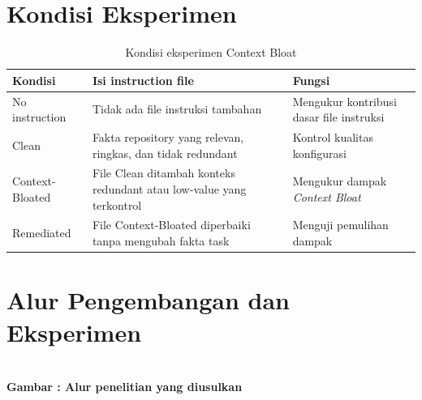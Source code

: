 \section{Kondisi Eksperimen}

\begin{table}[htbp]
\centering
\small
\caption{Kondisi eksperimen Context Bloat}
\label{tab:conditions}
\begin{tabularx}{\textwidth}{p{3.0cm}YY}
\toprule
\textbf{Kondisi} & \textbf{Isi instruction file} & \textbf{Fungsi} \\
\midrule
No instruction & Tidak ada file instruksi tambahan & Mengukur kontribusi dasar file instruksi \\
Clean & Fakta repository yang relevan, ringkas, dan tidak redundant & Kontrol kualitas konfigurasi \\
Context-Bloated & File Clean ditambah konteks redundant atau low-value yang terkontrol & Mengukur dampak \textit{Context Bloat} \\
Remediated & File Context-Bloated diperbaiki tanpa mengubah fakta task & Menguji pemulihan dampak \\
\bottomrule
\end{tabularx}
\end{table}

\section{Alur Pengembangan dan Eksperimen}

\begin{center}
\\[2mm]
\label{fig:config-flow}
\textbf{Gambar \thefigure: Alur penelitian yang diusulkan}
\end{center}

